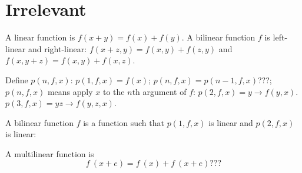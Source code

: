 \section{Irrelevant}

A linear function is $f(x+y) = f(x) + f(y)$.
A bilinear function \(f\) is left-linear and right-linear:
\(
f(x+z,y) = f(x,y) + f(z,y)
\)
and
\(
f(x,y+z) = f(x,y) + f(x,z)
\).

Define \(p(n,f,x)\):
$p(1,f,x) = f(x)$;
$p(n,f,x) = p(n-1,f,x)$???;
$p(n,f,x)$ means apply $x$ to the $n$th argument of $f$:
$p(2,f,x) = y \to f(y,x)$.
$p(3,f,x) = y z \to f(y,z,x)$.

A bilinear function $f$ is a function such that $p(1,f,x)$ is linear
and $p(2,f,x)$ is linear:

A multilinear function is
\[
f~(x + e) = f~(x) + f~(x + e)???
\]
